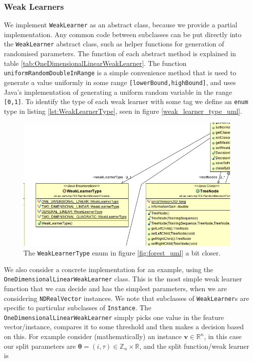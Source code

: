 \documentclass[12pt,twoside,notitlepage]{report}
\newcommand{\vc}[1]{\mathbf{#1}}
\newcommand{\bb}[1]{\mathbb{#1}}
\begin{document}
            \subsubsection{Weak Learners} \label{sec:weak_learner}
                We implement \texttt{WeakLearner} as an abstract class, because we provide a partial 
                implementation. Any common code between subclasses can be put directly into the \texttt{WeakLearner} 
                abstract class, such as helper functions for generation of randomised parameters. The function of each 
                abstract method is explained in table \ref{tab:OneDimensionalLinearWeakLearner}. The function 
                \texttt{uniformRandomDoubleInRange} is a simple convenience method that is used to generate a value 
                uniformly in some range \texttt{[lowerBound,highBound]}, 
                and uses Java's implementation of generating a uniform random variable in the range \texttt{[0,1]}. To 
                identify the type of each weak learner with some tag we define an \texttt{enum} type in listing 
                \ref{lst:WeakLearnerType}, seen in figure \ref{weak_learner_type_uml}. 

                \begin{figure}[H]
                    \centering
                    \includegraphics[scale=0.5]{WeakLearnerType_Forest_UML}
                    \caption{The \texttt{WeakLearnerType} enum in figure \ref{fig:forest_uml} a bit closer.}
                    \label{fig:weak_learner_type_uml}
                \end{figure}

                We also consider a concrete implementation for an example, using the \texttt{OneDimensionalLinearWeakLearner} 
                class. This is the most simple weak learner function that we can decide and has the simplest parameters, 
                when we are considering \texttt{NDRealVector} instances. We note that subclasses of \texttt{WeakLearner}s are
                specific to particular subclasses of \texttt{Instance}. 
                The \texttt{OneDimensionalLinearWeakLearner} simply picks one value in the feature vector/instance, compares 
                it to some threshold and then makes a decision based on this. For example consider (mathematically) an 
                instance $\vc{v} \in \bb{R}^n$, in this case our split parameters are $\vc{\theta} = (i,\tau) \in 
                \bb{Z}_n \times \bb{R}$, and the split function/weak learner is
\end{document}
